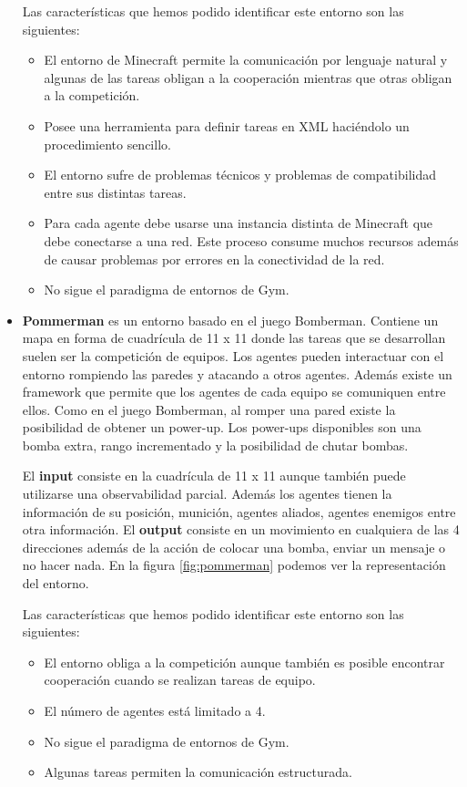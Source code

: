 \begin{itemize}
	      Las características que hemos podido identificar este entorno son las siguientes:
	      \begin{itemize}
		      \item El entorno de Minecraft permite la comunicación por lenguaje natural y algunas de las tareas obligan a la cooperación mientras que otras obligan a la competición.
		      \item Posee una herramienta para definir tareas en XML haciéndolo un procedimiento sencillo.
		      \item El entorno sufre de problemas técnicos y problemas de compatibilidad entre sus distintas tareas.
		      \item Para cada agente debe usarse una instancia distinta de Minecraft que debe conectarse a una red. Este proceso consume muchos recursos además de causar problemas por errores en la conectividad de la red.
		      \item No sigue el paradigma de entornos de Gym.
	      \end{itemize}

	\item \textbf{Pommerman} \cite {pommerman-repo} es un entorno basado en el juego Bomberman. Contiene un mapa en forma de cuadrícula de 11 x 11 donde las tareas que se desarrollan suelen ser la competición de equipos. Los agentes pueden interactuar con el entorno rompiendo las paredes y atacando a otros agentes. Además existe un framework que permite que los agentes de cada equipo se comuniquen entre ellos. Como en el juego Bomberman, al romper una pared existe la posibilidad de obtener un power-up. Los power-ups disponibles son una bomba extra, rango incrementado y la posibilidad de chutar bombas.  

	      El \textbf{input} consiste en la cuadrícula de 11 x 11 aunque también puede utilizarse una observabilidad parcial. Además los agentes tienen la información de su posición, munición, agentes aliados, agentes enemigos entre otra información. El \textbf{output} consiste en un movimiento en cualquiera de las 4 direcciones además de la acción de colocar una bomba, enviar un mensaje o no hacer nada. En la figura \ref {fig:pommerman} podemos ver la representación del entorno.

	      Las características que hemos podido identificar este entorno son las siguientes:
	      \begin{itemize}
		      \item El entorno obliga a la competición aunque también es posible encontrar cooperación cuando se realizan tareas de equipo.
		      \item El número de agentes está limitado a 4.
		      \item No sigue el paradigma de entornos de Gym.
		      \item Algunas tareas permiten la comunicación estructurada.
	      \end{itemize}


\end{itemize}
